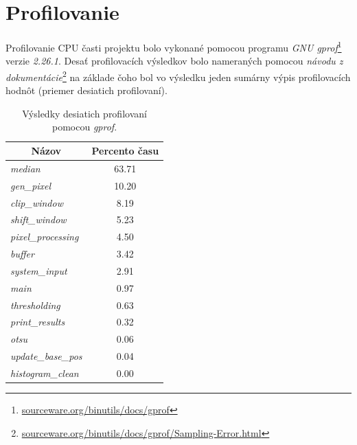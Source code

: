 \documentclass[11pt,a4paper]{article}
\begin{document}
\newpage
\section{Profilovanie}

Profilovanie CPU časti projektu bolo vykonané pomocou programu \textit{GNU gprof}\footnote{\href{https://sourceware.org/binutils/docs/gprof/}{sourceware.org/binutils/docs/gprof}} verzie \textit{2.26.1}. Desať profilovacích výsledkov bolo nameraných pomocou \textit{návodu z dokumentácie}\footnote{\href{https://sourceware.org/binutils/docs/gprof/Sampling-Error.html}{sourceware.org/binutils/docs/gprof/Sampling-Error.html}} na základe čoho bol vo výsledku jeden sumárny výpis profilovacích hodnôt (priemer desiatich profilovaní).\\

\begin{table}[H]
  \begin{center}
    \begin{tabular}{l|c}
        \multicolumn{1}{c|}{\textbf{Názov}} & \multicolumn{1}{c}{\textbf{Percento času}}\\
        \hline
        \textit{median}            & 63.71 \\
        \textit{gen\_pixel}        & 10.20 \\
        \textit{clip\_window}      & 8.19  \\
        \textit{shift\_window}     & 5.23  \\
        \textit{pixel\_processing} & 4.50  \\
        \textit{buffer}            & 3.42  \\
        \textit{system\_input}     & 2.91  \\
        \textit{main}              & 0.97  \\
        \textit{thresholding}      & 0.63  \\
        \textit{print\_results}    & 0.32  \\
        \textit{otsu}              & 0.06  \\
        \textit{update\_base\_pos} & 0.04  \\
        \textit{histogram\_clean}  & 0.00  \\
    \end{tabular}
    \caption{Výsledky desiatich profilovaní pomocou \textit{gprof}.}
    \label{tab:gprof}
  \end{center}
\end{table}
\end{document}
